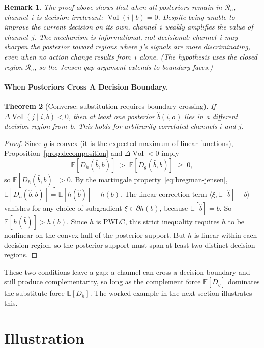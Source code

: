 \documentclass{article}
\newcommand{\VoI}{\operatorname{VoI}}
\newcommand{\bpost}{\hat{b}}
\newcommand{\E}{\mathbb{E}}
\newcommand{\Dg}{D_g}
\newcommand{\Dh}{D_h}
\newtheorem{theorem}{Theorem}
\newtheorem{remark}[theorem]{Remark}
\begin{document}
\begin{remark}
\label{rem:irrelevant}
The proof above shows that when all posteriors remain in $\mathcal{R}_a$, channel~$i$ is decision-irrelevant: $\VoI(i \mid b) = 0$.
Despite being unable to improve the current decision on its own, channel~$i$ weakly amplifies the value of channel~$j$.
The mechanism is informational, not decisional: channel~$i$ may sharpen the posterior toward regions where $j$'s signals are more discriminating, even when no action change results from~$i$ alone.
(The hypothesis uses the closed region $\mathcal{R}_a$, so the Jensen-gap argument extends to boundary faces.)
\end{remark}

\paragraph{When Posteriors Cross A Decision Boundary.}

\begin{theorem}[Converse: substitution requires boundary-crossing]
\label{thm:converse}
If $\Delta\VoI(j \mid i, b) < 0$, then at least one posterior $\bpost(i, o)$ lies in a different
decision region from~$b$.
This holds for arbitrarily correlated channels $i$ and $j$.
\end{theorem}

\begin{proof}
Since $g$ is convex (it is the expected maximum of linear functions),
Proposition~\ref{prop:decomposition} and $\Delta\VoI < 0$ imply
\[
  \E[\Dh(\bpost, b)] \;>\; \E[\Dg(\bpost, b)] \;\geq\; 0,
\]
so $\E[\Dh(\bpost, b)] > 0$.
By the martingale property~\eqref{eq:bregman-jensen},
$\E[\Dh(\bpost, b)] = \E[h(\bpost)] - h(b)$.
The linear correction term $\langle \xi, \E[\bpost] - b \rangle$ vanishes for any choice of subgradient $\xi \in \partial h(b)$, because $\E[\bpost] = b$.
So $\E[h(\bpost)] > h(b)$.
Since $h$ is PWLC, this strict inequality requires $h$ to be nonlinear on the convex hull
of the posterior support.
But $h$ is linear within each decision region, so the posterior support must span at least
two distinct decision regions.
\end{proof}


These two conditions leave a gap: a channel can cross a decision boundary and still produce complementarity, so long as the complement force $\E[\Dg]$ dominates the substitute force $\E[\Dh]$.
The worked example in the next section illustrates this.

\section{Illustration}
\label{sec:example}
\end{document}
